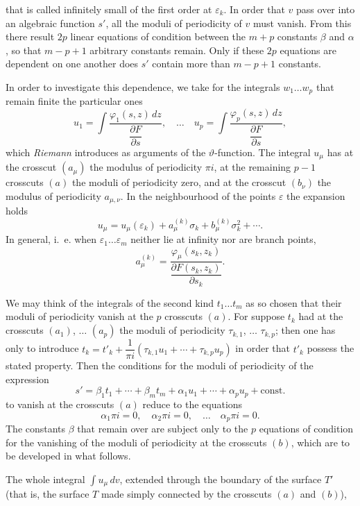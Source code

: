 \documentclass{article}
\begin{document}
that is called infinitely small of the first order at $\varepsilon_{k}$. In order that $v$ pass over into an algebraic function $s'$, all the moduli of periodicity of $v$ must vanish. From this there result $2p$ linear equations of condition between the $m+p$ constants $\beta$ and $\alpha$, so that $m-p+1$ arbitrary constants remain. Only if these $2p$ equations are dependent on one another does $s'$ contain more than $m-p+1$ constants.

In order to investigate this dependence, we take for the integrals $w_{1} \ldots w_{p}$ that remain finite the particular ones
\[ u_{1} = \int \frac{\varphi_{1}(s, z)\,dz}{\dfrac{\partial F}{\partial s}}, \quad \ldots \quad u_{p} = \int \frac{\varphi_{p}(s, z)\,dz}{\dfrac{\partial F}{\partial s}}, \]
which \emph{Riemann} introduces as arguments of the $\vartheta$-function. The integral $u_{\mu}$ has at the crosscut $(a_{\mu})$ the modulus of periodicity $\pi i$, at the remaining $p-1$ crosscuts $(a)$ the moduli of periodicity zero, and at the crosscut $(b_{\nu})$ the modulus of periodicity $a_{\mu, \nu}$. In the neighbourhood of the points $\varepsilon$ the expansion holds
\[ u_{\mu} = u_{\mu}(\varepsilon_{k}) + a_{\mu}^{(k)} \sigma_{k} + b_{\mu}^{(k)} \sigma_{k}^{2} + \cdots. \tag{a.} \]
In general, i.~e. when $\varepsilon_{1} \ldots \varepsilon_{m}$ neither lie at infinity nor are branch points,
\[ a_{\mu}^{(k)} = \frac{\varphi_{\mu}(s_{k}, z_{k})}{\dfrac{\partial F(s_{k}, z_{k})}{\partial s_{k}}}. \]

We may think of the integrals of the second kind $t_{1} \ldots t_{m}$ as so chosen that their moduli of periodicity vanish at the $p$ crosscuts $(a)$. For suppose $t_{k}$ had at the crosscuts $(a_{1})$, $\ldots$ $(a_{p})$ the moduli of periodicity $\tau_{k,1}$, $\ldots$ $\tau_{k,p}$; then one has only to introduce $t_{k} = t'_{k} + \dfrac{1}{\pi i}(\tau_{k,1} u_{1} + \cdots + \tau_{k,p} u_{p})$ in order that $t'_{k}$ possess the stated property. Then the conditions for the moduli of periodicity of the expression
\[ s' = \beta_{1} t_{1} + \cdots + \beta_{m} t_{m} + \alpha_{1} u_{1} + \cdots + \alpha_{p} u_{p} + \text{const.} \]
to vanish at the crosscuts $(a)$ reduce to the equations
\[ \alpha_{1} \pi i = 0, \quad \alpha_{2} \pi i = 0, \quad \ldots \quad \alpha_{p} \pi i = 0. \]
The constants $\beta$ that remain over are subject only to the $p$ equations of condition for the vanishing of the moduli of periodicity at the crosscuts $(b)$, which are to be developed in what follows.

The whole integral $\displaystyle\int u_{\mu}\,dv$, extended through the boundary of the surface $T'$ (that is, the surface $T$ made simply connected by the crosscuts $(a)$ and $(b)$),
\end{document}
